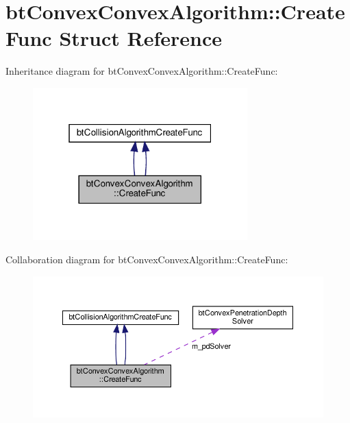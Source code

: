 \hypertarget{structbtConvexConvexAlgorithm_1_1CreateFunc}{}\section{bt\+Convex\+Convex\+Algorithm\+:\+:Create\+Func Struct Reference}
\label{structbtConvexConvexAlgorithm_1_1CreateFunc}


Inheritance diagram for bt\+Convex\+Convex\+Algorithm\+:\+:Create\+Func\+:
\nopagebreak
\begin{figure}[H]
\begin{center}
\leavevmode
\includegraphics[width=235pt]{structbtConvexConvexAlgorithm_1_1CreateFunc__inherit__graph}
\end{center}
\end{figure}


Collaboration diagram for bt\+Convex\+Convex\+Algorithm\+:\+:Create\+Func\+:
\nopagebreak
\begin{figure}[H]
\begin{center}
\leavevmode
\includegraphics[width=350pt]{structbtConvexConvexAlgorithm_1_1CreateFunc__coll__graph}
\end{center}
\end{figure}
